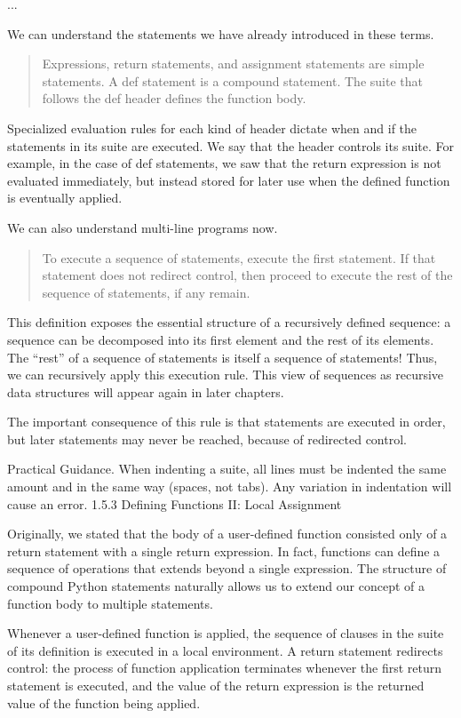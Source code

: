 \documentclass[letterpaper,10pt,dvipdfmx]{sphinxmanual}
\begin{document}
...

We can understand the statements we have already introduced in these terms.
\begin{quote}

Expressions, return statements, and assignment statements are simple statements.
A def statement is a compound statement. The suite that follows the def header defines the function body.
\end{quote}

Specialized evaluation rules for each kind of header dictate when and if the statements in its suite are executed. We say that the header controls its suite. For example, in the case of def statements, we saw that the return expression is not evaluated immediately, but instead stored for later use when the defined function is eventually applied.

We can also understand multi-line programs now.
\begin{quote}

To execute a sequence of statements, execute the first statement. If that statement does not redirect control, then proceed to execute the rest of the sequence of statements, if any remain.
\end{quote}

This definition exposes the essential structure of a recursively defined sequence: a sequence can be decomposed into its first element and the rest of its elements. The ``rest'' of a sequence of statements is itself a sequence of statements! Thus, we can recursively apply this execution rule. This view of sequences as recursive data structures will appear again in later chapters.

The important consequence of this rule is that statements are executed in order, but later statements may never be reached, because of redirected control.

Practical Guidance. When indenting a suite, all lines must be indented the same amount and in the same way (spaces, not tabs). Any variation in indentation will cause an error.
1.5.3   Defining Functions II: Local Assignment

Originally, we stated that the body of a user-defined function consisted only of a return statement with a single return expression. In fact, functions can define a sequence of operations that extends beyond a single expression. The structure of compound Python statements naturally allows us to extend our concept of a function body to multiple statements.

Whenever a user-defined function is applied, the sequence of clauses in the suite of its definition is executed in a local environment. A return statement redirects control: the process of function application terminates whenever the first return statement is executed, and the value of the return expression is the returned value of the function being applied.
\end{document}
